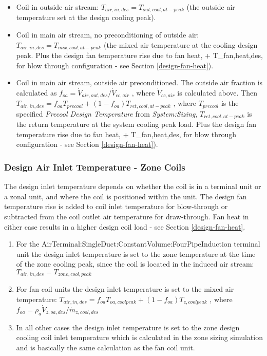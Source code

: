 \begin{itemize}
\item
  Coil in outside air stream: \(T_{air,in,des} = T_{out,cool,at-peak}\) (the outside air temperature set at the design cooling peak).
\item
  Coil in main air stream, no preconditioning of outside air: \(T_{air,in,des} = T_{mix,cool,at-peak}\) (the mixed air temperature at the cooling design peak. Plus the design fan temperature rise due to fan heat, + T_{fan,heat,des}, for blow through configuration - see Section \ref{design-fan-heat}).
\item
  Coil in main air stream, outside air preconditioned. The outside air fraction is calculated as \(f_{oa} = \dot V_{air,out,des}/\dot V_{cc,air}\) , where \(\dot V_{cc,air}\) is calculated above. Then \(T_{air,in,des} = f_{oa}T_{precool}+\left(1-f_{oa}\right)T_{ret,cool,at-peak}\) , where \(T_{precool}\) is the specified \emph{Precool Design Temperature} from \emph{System:Sizing}, \(T_{ret,cool,at-peak}\) is the return temperature at the system cooling peak load. Plus the design fan temperature rise due to fan heat, + T_{fan,heat,des}, for blow through configuration - see Section \ref{design-fan-heat}).
\end{itemize}

\subsubsection{Design Air Inlet Temperature - Zone Coils}\label{design-air-inlet-temperature---zone-coils}

The design inlet temperature depends on whether the coil is in a terminal unit or a zonal unit, and where the coil is positioned within the unit. The design fan temperature rise is added to coil inlet temperature for blow-through or subtracted from the coil outlet air temperature for draw-through. Fan heat in either case results in a higher design coil load - see Section \ref{design-fan-heat}.  

\begin{enumerate}
\def\labelenumi{\arabic{enumi}.}
\item
  For the AirTerminal:SingleDuct:ConstantVolume:FourPipeInduction terminal unit the design inlet temperature is set to the zone temperature at the time of the zone cooling peak, since the coil is located in the induced air stream: \(T_{air,in,des} = T_{zone,cool,peak}\)
\item
  For fan coil units the design inlet temperature is set to the mixed air temperature: \(T_{air,in,des} = f_{oa}T_{oa,coolpeak} + \left(1-f_{oa}\right)T_{z,coolpeak}\) , where \(f_{oa} = \rho_a \dot V_{z,oa,des} / \dot m_{z,cool,des}\)
\item
  In all other cases the design inlet temperature is set to the zone design cooling coil inlet temperature which is calculated in the zone sizing simulation and is basically the same calculation as the fan coil unit.
\end{enumerate}

